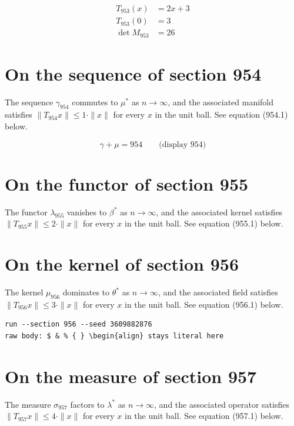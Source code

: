 \documentclass{article}
\begin{document}
\begin{align}
T_{953}(x) &= 2 x + 3 \\
T_{953}(0) &= 3 \\
\det M_{953} &= 26
\end{align}

\section{On the sequence of section 954}
The sequence $\gamma_{954}$ commutes to $\mu^{*}$ as $n \to \infty$,
and the associated manifold satisfies $\|T_{954} x\| \leq 1 \cdot \|x\|$
for every $x$ in the unit ball. See equation (954.1) below.

$$
\gamma + \mu = 954 \qquad \text{(display 954)}
$$

\section{On the functor of section 955}
The functor $\lambda_{955}$ vanishes to $\beta^{*}$ as $n \to \infty$,
and the associated kernel satisfies $\|T_{955} x\| \leq 2 \cdot \|x\|$
for every $x$ in the unit ball. See equation (955.1) below.

\section{On the kernel of section 956}
The kernel $\mu_{956}$ dominates to $\theta^{*}$ as $n \to \infty$,
and the associated field satisfies $\|T_{956} x\| \leq 3 \cdot \|x\|$
for every $x$ in the unit ball. See equation (956.1) below.

\begin{verbatim}
run --section 956 --seed 3609882876
raw body: $ & % { } \begin{align} stays literal here
\end{verbatim}

\section{On the measure of section 957}
The measure $\sigma_{957}$ factors to $\lambda^{*}$ as $n \to \infty$,
and the associated operator satisfies $\|T_{957} x\| \leq 4 \cdot \|x\|$
for every $x$ in the unit ball. See equation (957.1) below.
\end{document}
